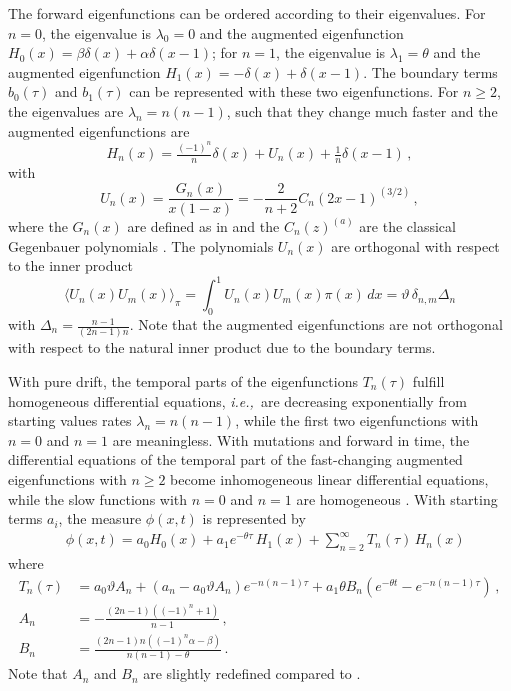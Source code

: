 \documentclass[preprint]{elsarticle}
\newcommand\ie{{\it i.e.,}}
\begin{document}
The forward eigenfunctions can be ordered according to their eigenvalues. For $n=0$, the eigenvalue is $\lambda_0=0$ and the augmented eigenfunction $H_0(x)=\beta\delta(x)+\alpha\delta(x-1)$; for $n=1$, the eigenvalue is $\lambda_1=\theta$ and the augmented eigenfunction $H_1(x)=-\delta(x)+\delta(x-1)$. The boundary terms $b_0(\tau)$ and $b_1(\tau)$ can be represented with these two eigenfunctions. For $n\geq 2$, the eigenvalues are $\lambda_n=n(n-1)$, such that they change much faster and the augmented eigenfunctions are \begin{equation}\label{eq:forw_eigen}
    H_n(x)=\tfrac{(-1)^n}{n}\delta(x)+U_n(x)+\tfrac{1}{n}\delta(x-1)\,,
\end{equation}
with 
\begin{equation}
    U_n(x)=\frac{G_n(x)}{x(1-x)}=-\frac2{n+2}C_n(2x-1)^{(3/2)}\,,
\end{equation}
where the $G_n(x)$ are defined as in \citet{Song12} and the $C_n(z)^{(a)}$ are the classical Gegenbauer polynomials \citep{Abra70}. The polynomials $U_n(x)$ are orthogonal with respect to the inner product
\begin{equation}
    \langle U_n(x) U_m(x) \rangle_{\pi}=\int_0^1 U_n(x) U_m(x) \pi(x)\,dx=\vartheta\, \delta_{n,m} \Delta_n
\end{equation}
with $\Delta_n=\frac{n-1}{(2n-1)n}$. Note that the augmented eigenfunctions are not orthogonal with respect to the natural inner product due to the boundary terms.

With pure drift, the temporal parts of the eigenfunctions $T_n(\tau)$ fulfill homogeneous differential equations, \ie\ are decreasing exponentially from starting values rates $\lambda_n=n(n-1)$, while the first two eigenfunctions with $n=0$ and $n=1$ are meaningless. With mutations and forward in time, the differential equations of the temporal part of the fast-changing augmented eigenfunctions with $n\geq 2$ become inhomogeneous linear differential equations, while the slow functions with $n=0$ and $n=1$ are homogeneous \citep{Vogl16}. With starting terms $a_i$, the measure $\phi(x,t)$ is represented by
\begin{equation}\label{eq:forw_expansion_boundary}
\begin{split}
    &\phi(x,t)= a_0 H_0(x)+a_1 e^{-\theta \tau}\,H_1(x)+\sum_{n=2}^\infty T_n(\tau)\,H_n(x)
\end{split}
\end{equation}
where 
\begin{equation}
\begin{split}
    T_n(\tau)&=a_0 \vartheta A_n+(a_n-a_0 \vartheta A_n)e^{-n(n-1) \tau} +a_1 \theta B_n (e^{-\theta t}-e^{-n(n-1) \tau})\,,\\
    A_n&=-\frac{(2n-1)((-1)^n+1)}{n-1}\,,\\
    B_n&=\frac{(2n-1)n((-1)^n\alpha-\beta)}{n(n-1)-\theta}\,.
\end{split}
\end{equation}
Note that $A_n$ and $B_n$ are slightly redefined compared to \citet{Vogl16}.
\end{document}
